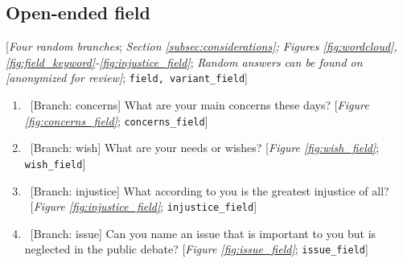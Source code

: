 \begin{enumerate}[resume]


\end{enumerate} 

 \subsection*{Open-ended field} 
 [\textit{Four random branches}; \textit{Section \ref{subsec:considerations}; Figures \ref{fig:wordcloud}, \ref{fig:field_keyword}-\ref{fig:injustice_field}}; \textit{Random answers can be found on [anonymized for review]}; 
 \verb|field, variant_field|] 
 \begin{enumerate}[resume] 
\item  \label{q:concerns_field} ~[Branch: concerns] What are your main concerns these days? [\textit{Figure \ref{fig:concerns_field}}; 
\verb|concerns_field|]


\item  \label{q:wish_field} ~[Branch: wish] What are your needs or wishes? [\textit{Figure \ref{fig:wish_field}}; 
\verb|wish_field|]


\item  \label{q:injustice_field} ~[Branch: injustice] What according to you is the greatest injustice of all?\\ 
~[\textit{Figure \ref{fig:injustice_field}}; 
\verb|injustice_field|]


\item  \label{q:issue_field} ~[Branch: issue] Can you name an issue that is important to you but is neglected in the public debate? [\textit{Figure \ref{fig:issue_field}}; 
\verb|issue_field|]


\end{enumerate} 

